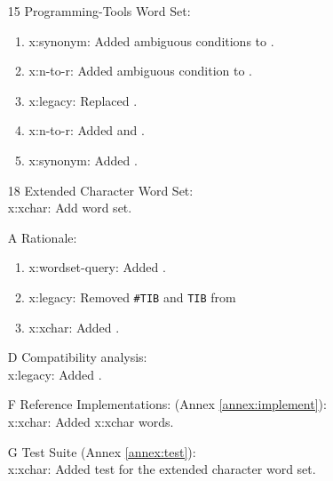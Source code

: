 \begin{itemize}
	\item[15] Programming-Tools Word Set:
		\begin{enumerate}
		\item \textsf{x:synonym}: Added ambiguous conditions to .
		\item \textsf{x:n-to-r}: Added ambiguous condition to .
		\item \textsf{x:legacy}: Replaced .
		\item \textsf{x:n-to-r}: Added  and .
		\item \textsf{x:synonym}: Added .
		\end{enumerate}

	\item[18] Extended Character Word Set: \\
		\textsf{x:xchar}: Add word set.

	\item[A] Rationale:								%
		\begin{enumerate}
		\item \textsf{x:wordset-query}: Added .
		\item \textsf{x:legacy}: Removed \texttt{\#TIB} and \texttt{TIB} from
		\item \textsf{x:xchar}: Added .
		\end{enumerate}

	\item[D] Compatibility analysis: \\			%
		\textsf{x:legacy}: Added .

	\item[F] Reference Implementations: (Annex \ref{annex:implement}): \\
		\textsf{x:xchar}: Added \textsf{x:xchar} words.

	\item[G] Test Suite (Annex \ref{annex:test}): \\
		\textsf{x:xchar}: Added test for the extended character word set.
	\end{itemize}


